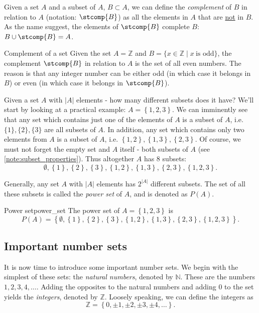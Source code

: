Given a set $A$ and a subset of $A$, $B\subset A$, we can define the \emph{complement} of $B$ in relation to $A$ (notation: $\stcomp{B}$) as all the elements in $A$ that are \underline{not} in $B$. As the name suggest, the elements of $\stcomp{B}$ complete $B$: $B\cup\stcomp{B}=A$.

\begin{example}{Complement of a set}{}
	Given the set $A=\mathbb{Z}$ and $B=\{x\in \mathbb{Z} \mid x\ \text{is odd}\}$, the complement $\stcomp{B}$ in relation to $A$ is the set of all even numbers. The reason is that any integer number can be either odd (in which case it belongs in $B$) or even (in which case it belongs in $\stcomp{B}$).
\end{example}

Given a set $A$ with $|A|$ elements - how many different subsets does it have? We'll start by looking at a practical example: $A=\left\{ 1,2,3 \right\}$. We can imminently see that any set which contains just one of the elements of $A$ is a subset of $A$, i.e. $\{1\},\{2\},\{3\}$ are all subsets of $A$. In addition, any set which contains only two elements from $A$ is a subset of $A$, i.e. $\left\{ 1,2 \right\}, \left\{ 1,3 \right\}, \left\{ 2,3 \right\}$. Of course, we must not forget the empty set and $A$ itself - both subsets of $A$ (see \autoref{note:subset_properties}). Thus altogether $A$ has $8$ subsets:
\[
	\emptyset, \left\{ 1 \right\}, \left\{ 2 \right\}, \left\{ 3 \right\}, \left\{ 1,2 \right\}, \left\{ 1,3 \right\}, \left\{ 2,3 \right\}, \left\{ 1,2,3 \right\}.
\]

Generally, any set $A$ with $|A|$ elements has $2^{|A|}$ different subsets. The set of all these subsets is called the \emph{power set} of $A$, and is denoted as $P(A)$.

\begin{example}{Power set}{power_set}
	The power set of $A=\left\{ 1,2,3 \right\}$ is
	\[
		P(A) = \left\{ \emptyset, \left\{ 1 \right\}, \left\{ 2 \right\}, \left\{ 3 \right\}, \left\{ 1,2 \right\}, \left\{ 1,3 \right\}, \left\{ 2,3 \right\}, \left\{ 1,2,3 \right\}\right\}.
	\]
\end{example}

\subsection{Important number sets}
It is now time to introduce some important number sets. We begin with the simplest of these sets: the \emph{natural numbers}, denoted by $\mathbb{N}$. These are the numbers $1,2,3,4,\dots$. Adding the opposites to the natural numbers and adding $0$ to the set yields the \emph{integers}, denoted by $\mathbb{Z}$. Loosely speaking, we can define the integers as
\begin{equation}
	\mathbb{Z}=\left\{ 0,\pm1,\pm2,\pm3,\pm4,\dots \right\}.
	\label{eq:integers}
\end{equation}


